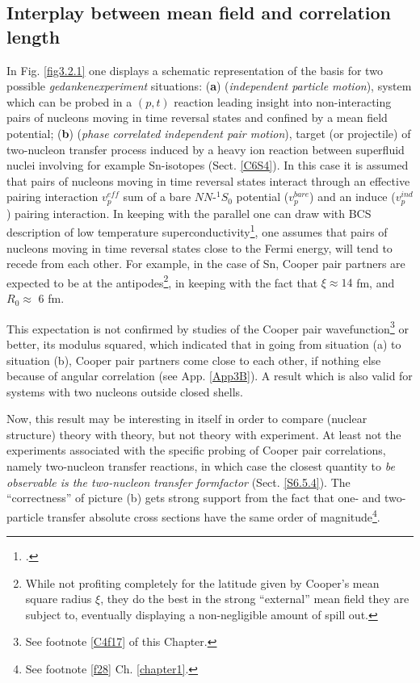 \subsection{Interplay between mean field and correlation length}\label{S4.3.1}
In Fig. \ref{fig3.2.1} one displays a schematic representation of the basis for two possible \textit{gedankenexperiment} situations: (\textbf{a}) (\textit{independent particle motion}), system which can be probed in a $(p,t)$ reaction leading insight into  non-interacting pairs of nucleons moving in time reversal states and confined by a mean field potential; (\textbf{b}) (\textit{phase correlated independent pair motion}), target (or projectile) of two-nucleon transfer process induced by  a heavy ion reaction between superfluid nuclei involving for example Sn-isotopes (Sect. \ref{C6S4}). In this case it is assumed that pairs of nucleons moving in time reversal states interact through an effective pairing interaction $v_p^{eff}$ sum of a bare $NN$-$^1S_0$ potential ($v_p^{bare}$) and an induce ($v_p^{ind}$) pairing interaction. In keeping with the parallel one can draw with BCS description of low temperature superconductivity\footnote{\cite{Bohr:58}.}, one assumes that pairs of nucleons moving in time reversal states close to the Fermi energy, will tend to recede from each other. For example, in the case of Sn, Cooper pair partners are expected to be at the antipodes\footnote{While not profiting completely for the latitude given by Cooper's mean square radius $\xi$, they do the best in the strong ``external'' mean field they are subject to, eventually displaying a non-negligible amount of spill out.}, in keeping with the fact that $\xi\approx14$ fm, and $R_0\approx$ 6 fm.

This expectation is not confirmed by studies of the Cooper pair wavefunction\footnote{See footnote \ref{C4f17} of this Chapter.} or better, its modulus squared, which indicated that in going from situation (a) to situation (b), Cooper pair partners come close to each other, if nothing else because of angular correlation (see App. \ref{App3B}). A result which is also valid for systems with two nucleons outside closed shells. 


Now, this result may be interesting in itself in order  to compare (nuclear structure) theory with theory, but not theory with experiment. At least not the experiments associated with the specific probing of Cooper pair correlations, namely two-nucleon transfer reactions, in which case the closest quantity to \textit{be observable is the two-nucleon transfer formfactor} (Sect. \ref{S6.5.4}).
 The ``correctness'' of picture (b) gets strong support from  the fact that one- and two-particle transfer  absolute cross sections have the same order of magnitude\footnote{\label{f24} See footnote \ref{f28} Ch. \ref{chapter1}.}. 


